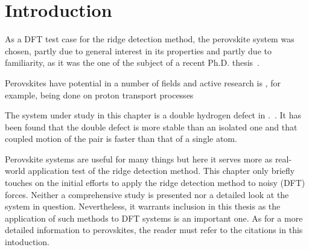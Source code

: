 \section{Introduction}
\label{sec:perovskites-introduction}

As a DFT test case for the ridge detection method, the  perovskite system was chosen, partly due to general interest in its properties and partly due to familiarity, as it was the one of the subject of a recent Ph.D. thesis~\cite{nicolai-2010}.

Perovskites have potential in a number of fields and active research is , for example, being done on proton transport processes~\cite{perovskites-hydrogen-diffusion-2007, perovskites-proton-transport-2008}

The system under study in this chapter is a double hydrogen defect in .~\cite{double-defect-2011}.
It has been found that the double defect is more stable than an isolated one and that coupled motion of the pair is faster than that of a single atom.

Perovskite systems are useful for many things but here it serves more as real-world application test of the ridge detection method.
This chapter only briefly touches on the initial efforts to apply the ridge detection method to noisy (DFT) forces.
Neither a comprehensive study is presented nor a detailed look at the system in question.
Nevertheless, it warrants inclusion in this thesis as the application of such methods to DFT systems is an important one.
As for a more detailed information to perovskites, the reader must refer to the citations in this intoduction.





